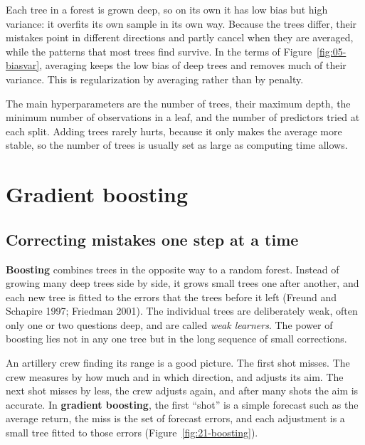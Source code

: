 Each tree in a forest is grown deep, so on its own it has low bias but high variance: it overfits its own sample in its own way. Because the trees differ, their mistakes point in different directions and partly cancel when they are averaged, while the patterns that most trees find survive. In the terms of Figure~\ref{fig:05-biasvar}, averaging keeps the low bias of deep trees and removes much of their variance. This is regularization by averaging rather than by penalty.

The main hyperparameters are the number of trees, their maximum depth, the minimum number of observations in a leaf, and the number of predictors tried at each split. Adding trees rarely hurts, because it only makes the average more stable, so the number of trees is usually set as large as computing time allows.

\section{Gradient boosting}
\label{sec:21-gbm}

\subsection{Correcting mistakes one step at a time}

\textbf{Boosting} combines trees in the opposite way to a random forest. Instead of growing many deep trees side by side, it grows small trees one after another, and each new tree is fitted to the errors that the trees before it left (Freund and Schapire 1997; Friedman 2001). The individual trees are deliberately weak, often only one or two questions deep, and are called \emph{weak learners}. The power of boosting lies not in any one tree but in the long sequence of small corrections.

An artillery crew finding its range is a good picture. The first shot misses. The crew measures by how much and in which direction, and adjusts its aim. The next shot misses by less, the crew adjusts again, and after many shots the aim is accurate. In \textbf{gradient boosting}, the first ``shot'' is a simple forecast such as the average return, the miss is the set of forecast errors, and each adjustment is a small tree fitted to those errors (Figure~\ref{fig:21-boosting}).

